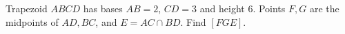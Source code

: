 Trapezoid $ABCD$ has bases $AB=2$, $CD=3$ and height 6. Points $F,G$ are the midpoints of $AD,BC$, and $E=AC\cap BD$. Find $[FGE]$.
